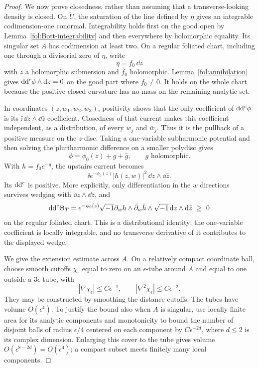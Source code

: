 \begin{proof}
We now prove closedness, rather than assuming that a transverse-looking
density is closed.  On $\widetilde U$, the saturation of the line defined
by $\eta$ gives an integrable codimension-one conormal.  Integrability
holds first on the good open by Lemma~\ref{fol:Bott-integrability} and
then everywhere by holomorphic equality.  Its singular set $A$ has
codimension at least two.  On a regular foliated chart, including one
through a divisorial zero of $\eta$, write
\begin{equation}\label{fol:local-foliation}
 \eta=f_0\,\dd z
\end{equation}
with $z$ a holomorphic submersion and $f_0$ holomorphic.
Lemma~\ref{fol:annihilation} gives
$\mathrm{d}\mathrm{d}^{c}\phi\wedge\mathrm{d} z=0$ on the good part where $f_0\ne0$.
It holds on the whole chart because the positive closed curvature
has no mass on the remaining analytic set.

In coordinates $(z,w_1,w_2,w_3)$, positivity shows that the only
coefficient of $\mathrm{d}\mathrm{d}^{c}\phi$ is its
$\ii\,\dd z\wedge\dd\bar z$ coefficient.  Closedness of that current
makes this coefficient independent, as a distribution, of every $w_j$
and $\bar w_j$.  Thus it is the pullback of a positive measure on the
$z$-disc.  Taking a one-variable subharmonic potential and then solving
the pluriharmonic difference on a smaller polydisc gives
\begin{equation}\label{fol:split-weight}
 \phi=\phi_0(z)+g+\bar g,\qquad g\text{ holomorphic}.
\end{equation}
With $h=f_0e^{-g}$, the upstairs current becomes
\[
 \ii e^{-\phi_0(z)}|h(z,w)|^2\,\dd z\wedge\dd\bar z.
\]
Its $\mathrm{d}\mathrm{d}^{c}$ is positive.  More explicitly, only differentiation in the
$w$ directions survives wedging with
$\dd z\wedge\dd\bar z$, and
\begin{equation}\label{fol:leaf-Hessian}
 \mathrm{d}\mathrm{d}^{c}\Theta_T
 =
 e^{-\phi_0(z)}
 \sqrt{-1}\partial_w h\wedge\bar\partial_w\bar h
 \wedge\sqrt{-1}\,\mathrm{d} z\wedge\mathrm{d}\bar z
 \ \geq\ 0
\end{equation}
on the regular foliated chart.  This is a distributional identity;
the one-variable coefficient is locally integrable, and no transverse
derivative of it contributes to the displayed wedge.

We give the extension estimate across $A$.  On a relatively compact
coordinate ball, choose smooth cutoffs $\chi_\epsilon$ equal to zero
on an $\epsilon$-tube around $A$ and equal to one outside a
$3\epsilon$-tube, with
\[
 |\nabla\chi_\epsilon|\leq C\epsilon^{-1},
 \qquad
 |\nabla^2\chi_\epsilon|\leq C\epsilon^{-2}.
\]
They may be constructed by smoothing the distance cutoffs.  The tubes
have volume $O(\epsilon^4)$.  To justify the bound also when $A$ is
singular, use locally finite area for its analytic components and
monotonicity to bound the number of disjoint balls of radius
$\epsilon/4$ centered on each component by
$C\epsilon^{-2d}$, where $d\leq2$ is its complex dimension.
Enlarging this cover to the tube gives volume
$O(\epsilon^{8-2d})=O(\epsilon^4)$; a compact subset meets finitely
many local components.


\end{proof}
